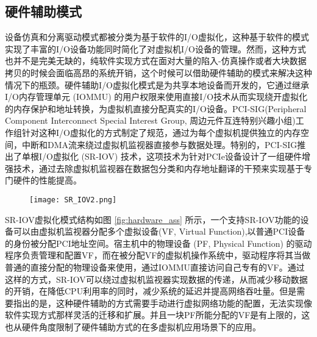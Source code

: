 \subsection{硬件辅助模式}
设备仿真和分离驱动模式都被分类为基于软件的I/O虚拟化，这种基于软件的模式实现了丰富的I/O设备功能同时简化了对虚拟机I/O设备的管理。然而，这种方式也并不是完美无缺的，纯软件实现方式在面对大量的陷入-仿真操作或者大块数据拷贝的时候会面临高昂的系统开销，这个时候可以借助硬件辅助的模式来解决这种情况下的瓶颈。硬件辅助I/O虚拟化模式是为共享本地设备而开发的，它通过继承I/O内存管理单元 (IOMMU) 的用户权限来使用直接I/O技术从而实现绕开虚拟化的内存保护和地址转换，为虚拟机直接分配真实的I/O设备。PCI-SIG(Peripheral Component Interconnect Special Interest Group, 周边元件互连特别兴趣小组)工作组针对这种I/O虚拟化的方式制定了规范，通过为每个虚拟机提供独立的内存空间，中断和DMA流来绕过虚拟机监视器直接参与数据处理。特别的，PCI-SIG推出了单根I/O虚拟化 (SR-IOV) 技术，这项技术为针对PCIe设备设计了一组硬件增强技术，通过去除虚拟机监视器在数据包分类和内存地址翻译的干预来实现基于专门硬件的性能提高。
\begin{figure}[!htp]
	\centering
	\texttt{[image: SR\_IOV2.png]}
\end{figure}
SR-IOV虚拟化模式结构如图 \ref{fig:hardware_ass} 所示，一个支持SR-IOV功能的设备可以由虚拟机监视器分配多个虚拟设备(VF, Virtual Function),以普通PCI设备的身份被分配PCI地址空间。宿主机中的物理设备 (PF, Physical Function) 的驱动程序负责管理和配置VF，而在被分配VF的虚拟机操作系统中，驱动程序将其当做普通的直接分配的物理设备来使用，通过IOMMU直接访问自己专有的VF。通过这样的方式，SR-IOV可以绕过虚拟机监视器实现数据的传递，从而减少移动数据的开销，在降低CPU利用率的同时，减少系统的延迟并提高网络吞吐量。但是需要指出的是，这种硬件辅助的方式需要手动进行虚拟网络功能的配置，无法实现像软件实现方式那样灵活的迁移和扩展。并且一块PF所能分配的VF是有上限的，这也从硬件角度限制了硬件辅助方式的在多虚拟机应用场景下的应用。


